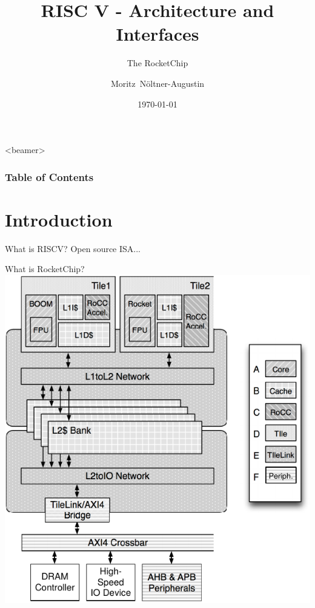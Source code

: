 \documentclass[]{beamer} %
\title[]{RISC V - Architecture and Interfaces}
\subtitle[]{The RocketChip}
\date{\today}
\author{Moritz~Nöltner-Augustin}
\institute[ZITI]{%
	Institut für Technische Informatik\\
	Lehrstuhl für Rechnerarchitektur\\
	Universität Heidelberg
}
\begin{document}

\begin{frame}[plain]
	\titlepage
\end{frame}


\begin{frame}<beamer>
	\frametitle{Table of Contents}
	\tableofcontents
\end{frame}




\section{Introduction}

\begin{frame}{What is RISCV?}
	Open source ISA...
\end{frame}

\begin{frame}{What is RocketChip?}
	\centering
	\includegraphics[width=0.90\pagewidth,height=0.80\pageheight,keepaspectratio]{EECS-2016-17_fig1}
\end{frame}
\end{document}
